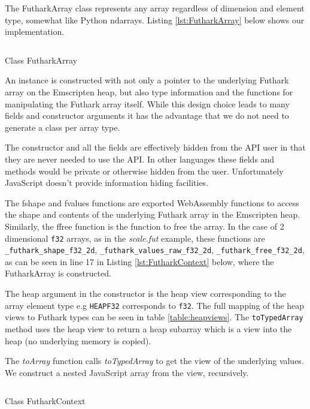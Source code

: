 \documentclass[11pt]{book}
\begin{document}
The FutharkArray class represents any array regardless of dimension and element type, somewhat like Python ndarrays. Listing \ref{lst:FutharkArray} below shows our implementation.


\begin{listing}[H] 
        \inputminted[fontsize=\small,baselinestretch=0.5,linenos]{JavaScript}{code/compiler/api_examples/FutharkArray.js}
        \caption{Class FutharkArray}
        \label{lst:FutharkArray}    
\end{listing} 

An instance is constructed with not only a pointer to the underlying Futhark array on the Emscripten heap, but also type information and the functions for manipulating the Futhark array itself. 
While this design choice leads to many fields and constructor arguments it has the advantage that we do not need to generate a class per array type.

The constructor and all the fields are effectively hidden from the API user in that they are never needed to use the API. In other languages these fields and methods would be private or otherwise hidden from the user. Unfortunately JavaScript doesn't provide information hiding facilities.

The fshape and fvalues functions are exported WebAssembly functions to access the shape and contents of the underlying Futhark array in the Emscripten heap. Similarly, the ffree function is the function to free the array. In the case of 2 dimensional \texttt{f32} arrays, as in the \textit{scale.fut} example, these functions are \texttt{\_futhark\_shape\_f32\_2d}, \texttt{\_futhark\_values\_raw\_f32\_2d}, \texttt{\_futhark\_free\_f32\_2d}, as can be seen in line 17 in Listing \ref{lst:FutharkContext} below, where the FutharkArray is constructed.

The heap argument in the constructor is the heap view corresponding to the array element type e.g \texttt{HEAPF32} corresponds to \texttt{f32}. The full mapping of the heap views to Futhark types can be seen in table \ref{table:heapviews}.
The \texttt{toTypedArray} method uses the heap view to return a heap subarray which is a view into the heap (no underlying memory is copied).

The \textit{toArray} function calls \textit{toTypedArray} to get the view of the underlying values.
We construct a nested JavaScript array from the view, recursively.


\begin{listing}[H] 
        \inputminted[fontsize=\small,baselinestretch=0.5,linenos]{JavaScript}{code/compiler/api_examples/FutharkContext.js}
        \caption{Class FutharkContext}
        \label{lst:FutharkContext}    
\end{listing} 
\end{document}
